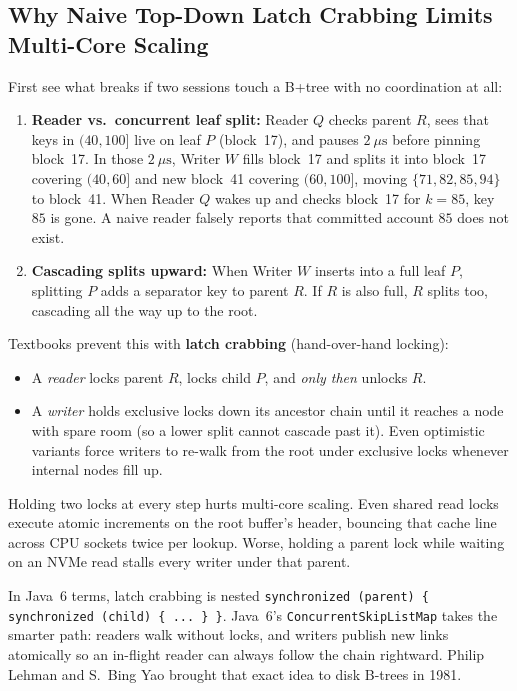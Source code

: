 \subsection{Why Naive Top-Down Latch Crabbing Limits Multi-Core Scaling}

First see what breaks if two sessions touch a B+tree with no coordination at all:
\begin{enumerate}
  \item \textbf{Reader vs.\ concurrent leaf split:} Reader $Q$ checks parent $R$, sees that keys in $(40, 100]$ live on leaf $P$ (block~17), and pauses $2~\mu\text{s}$ before pinning block~17. In those $2~\mu\text{s}$, Writer $W$ fills block~17 and splits it into block~17 covering $(40, 60]$ and new block~41 covering $(60, 100]$, moving $\{71, 82, 85, 94\}$ to block~41. When Reader $Q$ wakes up and checks block~17 for $k = 85$, key $85$ is gone. A naive reader falsely reports that committed account $85$ does not exist.
  \item \textbf{Cascading splits upward:} When Writer $W$ inserts into a full leaf $P$, splitting $P$ adds a separator key to parent $R$. If $R$ is also full, $R$ splits too, cascading all the way up to the root.
\end{enumerate}

Textbooks prevent this with \textbf{latch crabbing} (hand-over-hand locking):
\begin{itemize}
  \item A \emph{reader} locks parent $R$, locks child $P$, and \emph{only then} unlocks $R$.
  \item A \emph{writer} holds exclusive locks down its ancestor chain until it reaches a node with spare room (so a lower split cannot cascade past it). Even optimistic variants force writers to re-walk from the root under exclusive locks whenever internal nodes fill up.
\end{itemize}

Holding two locks at every step hurts multi-core scaling. Even shared read locks execute atomic increments on the root buffer's header, bouncing that cache line across CPU sockets twice per lookup. Worse, holding a parent lock while waiting on an NVMe read stalls every writer under that parent.

In Java~6 terms, latch crabbing is nested \texttt{synchronized (parent) \{ synchronized (child) \{ ... \} \}}. Java~6's \texttt{ConcurrentSkipListMap} takes the smarter path: readers walk without locks, and writers publish new links atomically so an in-flight reader can always follow the chain rightward. Philip Lehman and S.~Bing Yao brought that exact idea to disk B-trees in 1981.

